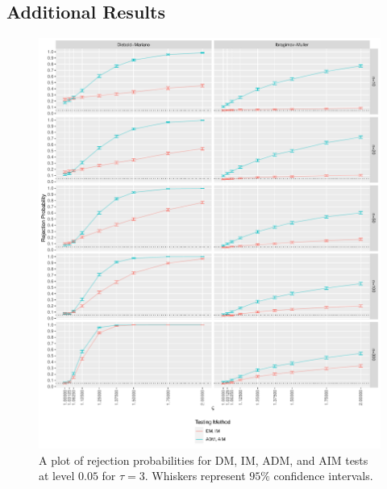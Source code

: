\documentclass[11pt,dvipsnames]{article}
\begin{document}
\begin{appendices}
\newpage
\section{Additional Results}\label{appendix:Additional}

\begin{figure}[!htbp]
\centering
\includegraphics[width=.9\linewidth]{../../Scripts/Power/Outputs/Power_h=3_Article.pdf}
\caption{A plot of rejection probabilities for DM, IM, ADM, and AIM tests at level $ 0.05 $ for $ \tau=3 $. Whiskers represent $ 95\% $ confidence intervals.
}
\label{fig:Power_3} 
\end{figure}



\end{appendices}
\end{document}
